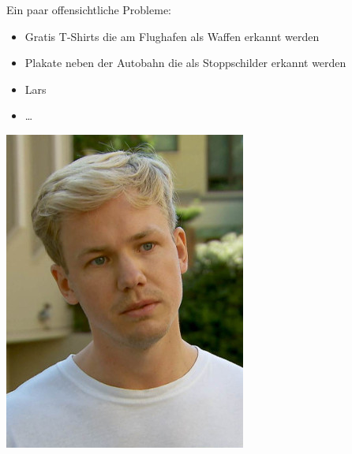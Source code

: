 \documentclass[aspectratio=43]{beamer}
\begin{document}
\begin{frame}
Ein paar offensichtliche Probleme:
\bigskip
\begin{multicols}{2}
\begin{itemize}
\item Gratis T-Shirts die am Flughafen als Waffen erkannt werden
\item Plakate neben der Autobahn die als Stoppschilder erkannt werden
\item Lars
\item \dots
\end{itemize}
\columnbreak
\includegraphics[scale=0.45]{images/lars_sweden.jpg} 
\end{multicols}
\end{frame}
\end{document}

